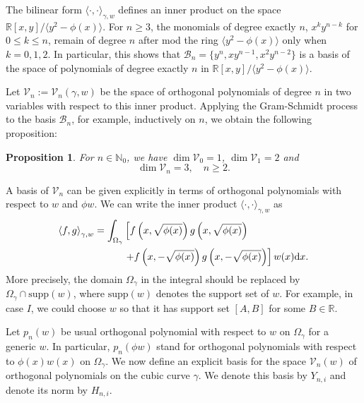 \documentclass{amsart}
\newtheorem{prop}[thm]{Proposition}
\theoremstyle{remark}
\def\la{{\langle}}
\def\ra{{\rangle}}
\def\d{\mathrm{d}}
\def\g{{\gamma}}
\def\la{{\langle}}
\def\ra{{\rangle}}
\def\CB{{\mathcal B}}
\def\CV{{\mathcal V}}
\def\NN{{\mathbb N}}
\def\RR{{\mathbb R}}
\begin{document}
The bilinear form $\la \cdot,\cdot\ra_{\g,w}$ defines an inner product on the space $\RR[x,y] / \la y^2 - \phi(x)\ra$. 
For $n\ge 3$, the monomials of degree exactly $n$, $x^k y^{n-k}$ for $0 \le k \le n$, remain of degree $n$ 
after mod the ring $\la y^2 - \phi(x)\ra$ only when $k =0,1,2$. In particular, this shows that 
$\CB_n = \{y^n, x y ^{n-1}, x^2 y^{n-2}\}$ is a basis of the space of polynomials of degree exactly $n$ in 
$\RR[x,y] / \la y^2 - \phi(x)\ra$. 

Let $\CV_n:=\CV_n(\g,w)$ be the space of orthogonal polynomials of degree $n$ in two variables with respect to this 
inner product. Applying the Gram-Schmidt process to the basis $\CB_n$, for example, inductively on $n$, 
we obtain the following proposition:

\begin{prop}\label{prop:dimVn}
For $n \in \NN_0$, we have $\dim \CV_0 =1$, $\dim \CV_1 =2$ and 
$$
   \dim \CV_n =3, \quad n \ge 2.
$$
\end{prop}

A basis of $\CV_n$ can be given explicitly in terms of orthogonal polynomials with respect to $w$ and $\phi w$.
We can write the inner product $\la \cdot,\cdot\ra_{\g,w}$ as 
\begin{align} \label{eq:ipd2}
  \la f,g \ra_{\g,w} = \int_{\Omega_\g} & \left[  f\left(x, \sqrt{\phi(x)} \right) g\left(x, \sqrt{\phi(x)} \right) \right. \\
      & \left. + f\left(x, - \sqrt{\phi(x)} \right) g\left(x, -\sqrt{\phi(x)} \right)\right] w(x) \d x. \notag
\end{align}
More precisely, the domain $\Omega_\g$ in the integral should be replaced by $\Omega_\g \cap \mathrm{supp}(w)$,
where $\mathrm{supp}(w)$ denotes the support set of $w$. For example, in case $I$, we could choose $w$ 
so that it has support set $[A,B]$ for some $B \in \RR$. 

Let $p_n(w)$ be usual orthogonal polynomial with respect to $w$ on $\Omega_\g$ for a generic $w$. In particular,
$p_n(\phi w)$ stand for orthogonal polynomials with respect to $\phi(x) w(x)$ on $\Omega_\g$. We now define an 
explicit basis for the space $\CV_n(w)$ of orthogonal polynomials on the cubic curve $\g$. We denote this basis by 
$Y_{n,i}$ and denote its norm by $H_{n,i}$. 
 
\end{document}
